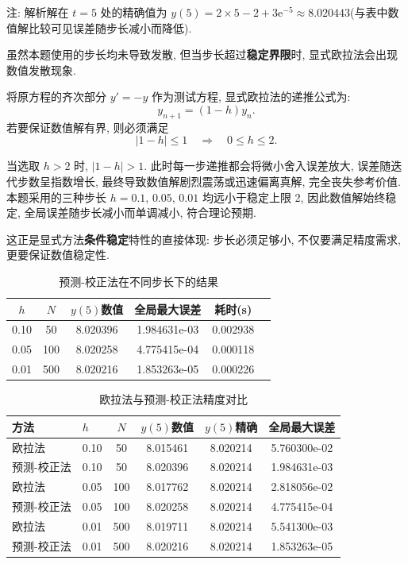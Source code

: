 \documentclass[zihao=-4,a4paper]{ctexart}
\begin{document}
注: 解析解在 $t=5$ 处的精确值为 $y(5) = 2\times5 - 2 + 3\mathrm{e}^{-5} \approx 8.020443$(与表中数值解比较可见误差随步长减小而降低). 


虽然本题使用的步长均未导致发散, 但当步长超过\textbf{稳定界限}时, 显式欧拉法会出现数值发散现象. 


将原方程的齐次部分 $y' = -y$ 作为测试方程, 显式欧拉法的递推公式为: 
\[
y_{n+1} = (1 - h) y_n.
\]
若要保证数值解有界, 则必须满足
\[
|1 - h| \le 1 \quad\Longrightarrow\quad 0 \le h \le 2.
\]

当选取 $h > 2$ 时, $|1 - h| > 1$. 此时每一步递推都会将微小舍入误差放大, 误差随迭代步数呈指数增长, 最终导致数值解剧烈震荡或迅速偏离真解, 完全丧失参考价值. 本题采用的三种步长 $h=0.1,\,0.05,\,0.01$ 均远小于稳定上限 2, 因此数值解始终稳定, 全局误差随步长减小而单调减小, 符合理论预期. 

这正是显式方法\textbf{条件稳定}特性的直接体现: 步长必须足够小, 不仅要满足精度需求, 更要保证数值稳定性. 


\begin{table}[H]
    \centering
    \caption{预测-校正法在不同步长下的结果}
    \label{tab:heun_results}
    \begin{tabular}{@{}cccccc@{}}
        \toprule
        $h$ & $N$ & $y(5)$数值 & 全局最大误差 & 耗时(s) \\
        \midrule
        0.10 & 50  & 8.020396 & 1.984631e-03 & 0.002938 \\
        0.05 & 100 & 8.020258 & 4.775415e-04 & 0.000118 \\
        0.01 & 500 & 8.020216 & 1.853263e-05 & 0.000226 \\
        \bottomrule
    \end{tabular}
\end{table}
\begin{table}[H]
    \centering
    \caption{欧拉法与预测-校正法精度对比}
    \label{tab:euler_vs_heun}
    \begin{tabular}{@{}llcccc@{}}
        \toprule
        方法 & $h$ & $N$ & $y(5)$数值 & $y(5)$精确 & 全局最大误差 \\
        \midrule
        欧拉法      & 0.10 & 50  & 8.015461 & 8.020214 & 5.760300e-02 \\
        预测-校正法 & 0.10 & 50  & 8.020396 & 8.020214 & 1.984631e-03 \\
        \midrule
        欧拉法      & 0.05 & 100 & 8.017762 & 8.020214 & 2.818056e-02 \\
        预测-校正法 & 0.05 & 100 & 8.020258 & 8.020214 & 4.775415e-04 \\
        \midrule
        欧拉法      & 0.01 & 500 & 8.019711 & 8.020214 & 5.541300e-03 \\
        预测-校正法 & 0.01 & 500 & 8.020216 & 8.020214 & 1.853263e-05 \\
        \bottomrule
    \end{tabular}
\end{table}
\end{document}
